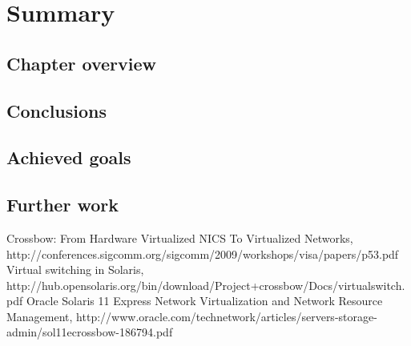 \documentclass[11pt]{book}
\begin{document}
  \chapter{Summary}

    \section*{Chapter overview}

    \section{Conclusions}

    \section{Achieved goals}

    \section{Further work}


  \begin{thebibliography}{some-label}

    
    \bibitem[1]{} Crossbow: From Hardware Virtualized NICS To Virtualized Networks, http://conferences.sigcomm.org/sigcomm/2009/workshops/visa/papers/p53.pdf
    \bibitem[2]{} Virtual switching in Solaris, http://hub.opensolaris.org/bin/download/Project+crossbow/Docs/virtualswitch.pdf
    \bibitem[3]{} Oracle Solaris 11 Express Network Virtualization and Network Resource Management, http://www.oracle.com/technetwork/articles/servers-storage-admin/sol11ecrossbow-186794.pdf

  \end{thebibliography}
\end{document}
